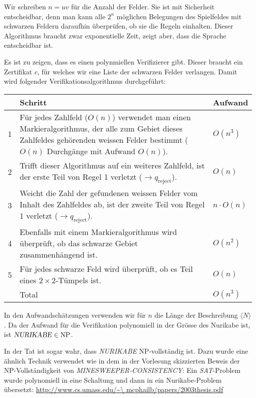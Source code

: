 \begin{loesung}
Wir schreiben $n=uv$ für die Anzahl der Felder.
Sie ist mit Sicherheit entscheidbar, denn man kann alle $2^{n}$
möglichen Belegungen des Spielfeldes mit schwarzen Feldern daraufhin
überprüfen, ob sie die Regeln einhalten. Dieser Algorithmus braucht
zwar exponentielle Zeit, zeigt aber, dass die Sprache entscheidbar ist.

Es ist zu zeigen, dass es einen polynmiellen Verifizierer gibt. Dieser
braucht ein Zertifikat $c$, für welches wir eine Liste der schwarzen
Felder verlangen. Damit wird folgender Verifikationsalgorithmus
durchgeführt:

\begin{tabular}{rll}
&Schritt&Aufwand\\
\hline
1&\begin{minipage}[t]{4.2truein}\strut
Für jedes Zahlfeld ($O(n)$) verwendet man einen Markieralgorithmus,
der alle zum Gebiet dieses Zahlfeldes gehörenden weissen
Felder bestimmt ($O(n)$ Durchgänge mit Aufwand
$O(n)$).\strut\end{minipage}&$O(n^3)$\\
2&\begin{minipage}[t]{4.2truein}\strut
Trifft dieser Algorithmus auf ein weiteres
Zahlfeld, ist der erste Teil von Regel 1 verletzt
($\to q_{\text{reject}}$).
\strut\end{minipage}&$O(n)$\\
3&\begin{minipage}[t]{4.2truein}\strut
Weicht die Zahl der gefundenen weissen Felder vom Inhalt des Zahlfeldes
ab, ist der zweite Teil von Regel 1 verletzt
($\to q_{\text{reject}}$).\strut\end{minipage}&$n\cdot O(n)$\\
4&\begin{minipage}[t]{4.2truein}\strut
Ebenfalls mit einem Markieralgorithmus wird überprüft, ob das
schwarze Gebiet zusammenhängend ist.
\strut\end{minipage}&$O(n^2)$\\
5&\begin{minipage}[t]{4.2truein}\strut
Für jedes schwarze Feld wird überprüft, ob es Teil eines
$2\times 2$-Tümpels ist.
\strut\end{minipage}&$O(n)$\\
\hline
&Total&$O(n^3)$
\end{tabular}

In den Aufwandschätzungen verwenden wir für $n$ die Länge der
Beschreibung $\langle N\rangle$. Da der Aufwand für die Verifikation
polynomiell in der Grösse des Nurikabe ist, ist
$\text{\textsl{NURIKABE}}\in\operatorname{NP}$.

In der Tat ist sogar wahr, dass \textsl{NURIKABE} NP-vollständig
ist. Dazu wurde eine ähnlich Technik verwendet wie in dem in
der Vorlesung skizzierten Beweis
der NP-Vollständigkeit von \textsl{MINESWEEPER-CONSISTENCY}:
Ein \textsl{SAT}-Problem wurde polynomiell in eine Schaltung und dann in
ein Nurikabe-Problem übersetzt:
\url{http://www.cs.umass.edu/\~\ mcphailb/papers/2003thesis.pdf}
\end{loesung}

